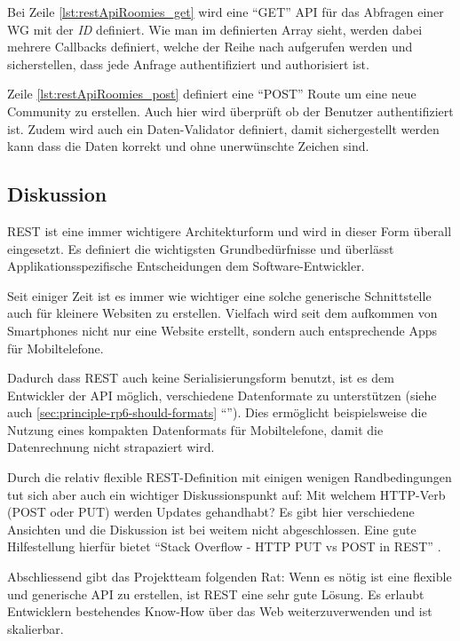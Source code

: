 Bei Zeile \autoref{lst:restApiRoomies_get} wird eine ``GET'' API für das Abfragen einer WG mit der \emph{ID} definiert. Wie man im definierten Array sieht, werden dabei mehrere Callbacks definiert, welche der Reihe nach aufgerufen werden und sicherstellen, dass jede Anfrage authentifiziert und authorisiert ist.

Zeile \autoref{lst:restApiRoomies_post} definiert eine ``POST'' Route um eine neue Community zu erstellen. Auch hier wird überprüft ob der Benutzer authentifiziert ist. Zudem wird auch ein Daten-Validator definiert, damit sichergestellt werden kann dass die Daten korrekt und ohne unerwünschte Zeichen sind.

\subsection*{Diskussion}

REST ist eine immer wichtigere Architekturform und wird in dieser Form überall eingesetzt. Es definiert die wichtigsten Grundbedürfnisse und überlässt Applikationsspezifische Entscheidungen dem Software-Entwickler.

Seit einiger Zeit ist es immer wie wichtiger eine solche generische Schnittstelle auch für kleinere Websiten zu erstellen. Vielfach wird seit dem aufkommen von Smartphones nicht nur eine Website erstellt, sondern auch entsprechende Apps für Mobiltelefone.

Dadurch dass REST auch keine Serialisierungsform benutzt, ist es dem Entwickler der API möglich, verschiedene Datenformate zu unterstützen (siehe auch \ref{sec:principle-rp6-should-formats} ``''). Dies ermöglicht beispielsweise die Nutzung eines kompakten Datenformats für Mobiltelefone, damit die Datenrechnung nicht strapaziert wird.

Durch die relativ flexible REST-Definition mit einigen wenigen Randbedingungen tut sich aber auch ein wichtiger Diskussionspunkt auf: Mit welchem HTTP-Verb (POST oder PUT) werden Updates gehandhabt? Es gibt hier verschiedene Ansichten und die Diskussion ist bei weitem nicht abgeschlossen. Eine gute Hilfestellung hierfür bietet ``Stack Overflow - HTTP PUT vs POST in REST'' \cite{StackoverflowPUTvsPOST}.

Abschliessend gibt das Projektteam folgenden Rat: Wenn es nötig ist eine flexible und generische API zu erstellen, ist REST eine sehr gute Lösung. Es erlaubt Entwicklern bestehendes Know-How über das Web weiterzuverwenden und ist skalierbar.